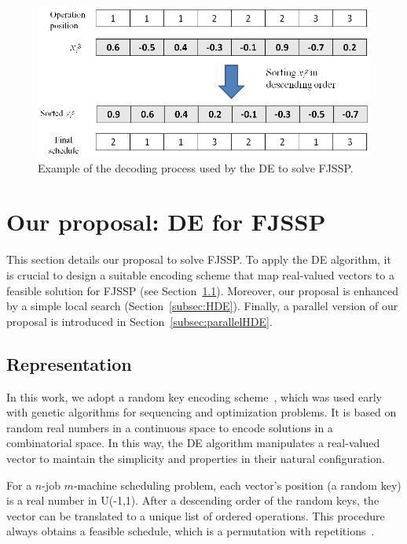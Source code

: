 \begin{figure}[!htb]
    \centering
    \includegraphics[width=\columnwidth]{./figures/deco.eps}
    \caption{Example of the decoding process used by the DE to solve FJSSP.}
    \label{fig:decodificacion}
    \vspace{-0.4cm}
\end{figure} 

\section{Our proposal: DE for FJSSP}
\label{sec:HDE}
\vspace{-0.2cm}
This section details our proposal to solve FJSSP. To apply the DE algorithm, it is crucial to design a suitable encoding scheme that map real-valued vectors to a feasible solution for FJSSP (see Section~\ref{subsec:rep}). Moreover, our proposal is enhanced by a simple local search (Section~\ref{subsec:HDE}). Finally, a parallel version of our proposal is introduced in Section~\ref{subsec:parallelHDE}.


\subsection{Representation}  \label{subsec:rep}

In this work, we adopt a random key encoding scheme~\cite{Bean1994RepRandomKeys}, which was used early with genetic algorithms for sequencing and optimization problems. It is based on random real numbers in a continuous space to encode solutions in a combinatorial space. In this way, the DE algorithm manipulates a real-valued vector to maintain the simplicity and properties in their natural configuration.

For a $n$-job $m$-machine scheduling problem, each vector's position (a random key) is a real number in U(-1,1). After a descending order of the random keys, the vector can be translated to a unique list of ordered operations. This procedure always obtains a feasible schedule, which is a permutation with repetitions~\cite{bierwirth1995}. 

